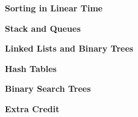 \documentclass[12pt,twoside]{article}
\begin{document}


{\large 
\textbf{Sorting in Linear Time}}
\begin{problems}

\problem  %

\problem  %

{\large 
\textbf{Stack and Queues}}

\problem  %

\problem  %

{\large 
\textbf{Linked Lists and Binary Trees}}

\problem

\problem

{\large 
\textbf{Hash Tables}}

\problem

\problem

\problem

{\large 
\textbf{Binary Search Trees}}

\problem

\problem

\problem

\problem

\problem

\newpage
{\large
\textbf{Extra Credit}
}

\problem  

\problem  

\problem

\end{problems}
\end{document}
